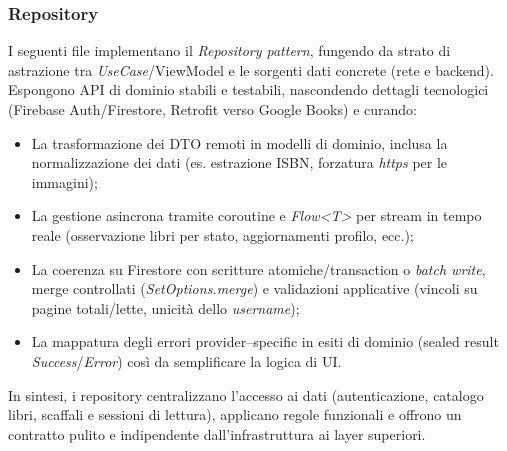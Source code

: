 \documentclass{article}
\begin{document}
\subsubsection{Repository}
I seguenti file implementano il \textit{Repository pattern}, fungendo da strato di astrazione tra \textit{UseCase}/ViewModel e le sorgenti dati concrete (rete e backend). Espongono API di dominio stabili e testabili, nascondendo dettagli tecnologici (Firebase Auth/Firestore, Retrofit verso Google Books) e curando: 
\begin{itemize}
  \item La trasformazione dei DTO remoti in modelli di dominio, inclusa la normalizzazione dei dati (es. estrazione ISBN, forzatura \textit{https} per le immagini); 
  \item La gestione asincrona tramite coroutine e \textit{Flow\textless{}T\textgreater{}} per stream in tempo reale (osservazione libri per stato, aggiornamenti profilo, ecc.); 
  \item La coerenza su Firestore con scritture atomiche/transaction o \textit{batch write}, merge controllati (\textit{SetOptions.merge}) e validazioni applicative (vincoli su pagine totali/lette, unicità dello \textit{username}); 
  \item La mappatura degli errori provider–specific in esiti di dominio (sealed result \textit{Success}/\textit{Error}) così da semplificare la logica di UI. 
  \end{itemize}
In sintesi, i repository centralizzano l’accesso ai dati (autenticazione, catalogo libri, scaffali e sessioni di lettura), applicano regole funzionali e offrono un contratto pulito e indipendente dall’infrastruttura ai layer superiori.
\end{document}
